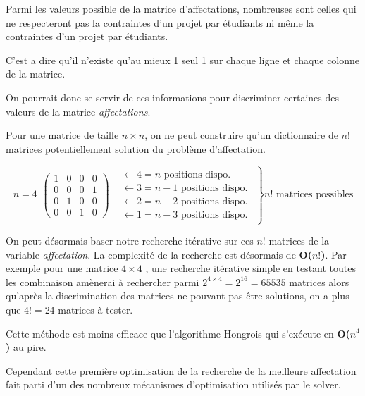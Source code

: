 \documentclass{polytech/polytech}
\begin{document}
Parmi les valeurs possible de la matrice d'affectations, nombreuses sont celles qui ne respecteront pas la contraintes d'un projet par étudiants ni même la contraintes d'un projet par étudiants. 

C'est a dire qu'il n'existe qu'au mieux 1 seul 1 sur chaque ligne et chaque colonne de la matrice.

On pourrait donc se servir de ces informations pour discriminer certaines des valeurs de la matrice \textit{affectations}.

Pour une matrice de taille $n\times n$, on ne peut construire qu'un dictionnaire de $n!$ matrices potentiellement solution du problème d'affectation. 

\begin{equation}
\left.
n=4
\begin{array}{cc}
\left(
\begin{array}{cccc}
1 & 0 & 0 & 0 \\ 
0 & 0 & 0 & 1 \\ 
0 & 1 & 0 & 0 \\ 
0 & 0 & 1 & 0
\end{array} 
\right)
&
\begin{array}{l}
\leftarrow 4=n \text{  positions dispo.}\\ 
\leftarrow 3=n-1 \text{  positions dispo.} \\ 
\leftarrow 2=n-2 \text{  positions dispo.}\\ 
\leftarrow 1=n-3 \text{  positions dispo.}
\end{array} 
\end{array}
\right\rbrace
n! \text{ matrices possibles}
\end{equation}

On peut désormais baser notre recherche itérative sur ces $n!$ matrices de la variable \textit{affectation}. La complexité de la recherche est désormais de  \textbf{O($n!$)}. Par exemple pour une matrice $4\times 4$ , une recherche itérative simple en testant toutes les combinaison amènerai à rechercher parmi $2^{4\times 4} = 2^{16}=65535$ matrices alors qu'après la discrimination des matrices ne pouvant pas être solutions, on a plus que $4!=24$ matrices à tester. 

Cette méthode est moins efficace que l'algorithme Hongrois qui s'exécute en \textbf{O($n^4$)} au pire.

Cependant cette première optimisation de la recherche de la meilleure affectation fait parti d'un des nombreux mécanismes d'optimisation utilisés par le solver.
\end{document}
